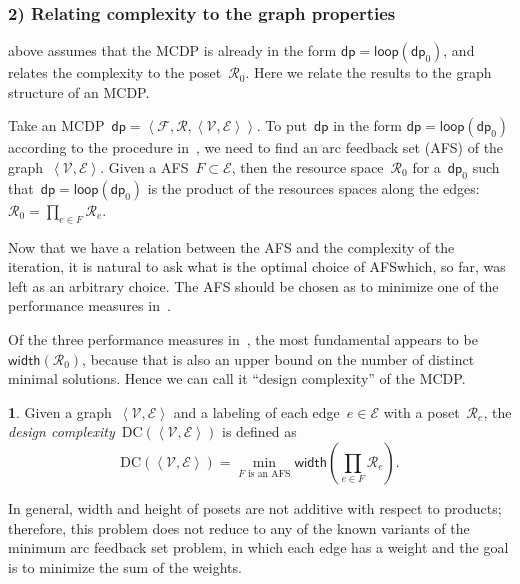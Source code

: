 \documentclass[twocolumn,english]{IEEEtran}
\theoremstyle{definition}
\newtheorem{defn}{\protect\definitionname}
\theoremstyle{plain}
\theoremstyle{definition}
\theoremstyle{remark}
\theoremstyle{definition}
\theoremstyle{plain}
\theoremstyle{plain}
\newcommand{\aword}[1]{\mathsf{#1}}
\newcommand{\vmath}[1]{\aword{#1}}
\newcommand{\posetwidth}{\vmath{width}}
\newcommand{\funsp}{\mathscr{F}}
\newcommand{\ressp}{\mathscr{R}}
\newcommand{\dprob}{\vmath{dp}}
\newcommand{\dploop}{\vmath{loop}}
\newcommand{\cdpiN}{\mathcal{V}}
\providecommand{\definitionname}{Definition}
\begin{document}
\subsubsection*{2) Relating complexity to the graph properties}

 above assumes that the MCDP is already in the
form $\dprob=\dploop(\dprob_{0})$, and relates the complexity to
the poset~$\ressp_{0}$. Here we relate the results to the graph
structure of an MCDP.

Take an MCDP~$\dprob=\left\langle \funsp,\ressp,\left\langle \cdpiN,\mathcal{E}\right\rangle \right\rangle $.
To put~$\dprob$ in the form $\dprob=\dploop(\dprob_{0})$ according
to the procedure in~, we need to find an arc
feedback set (AFS) of the graph~$\left\langle \cdpiN,\mathcal{E}\right\rangle $.
Given a AFS~$F\subset\mathcal{E}$, then the resource space~$\ressp_{0}$
for a~$\dprob_{0}$ such that~$\dprob=\dploop(\dprob_{0})$ is the
product of the resources spaces along the edges: $\ressp_{0}=\prod_{e\in F}\ressp_{e}.$

Now that we have a relation between the AFS and the complexity of
the iteration, it is natural to ask what is the optimal choice of
AFS\textemdash which, so far, was left as an arbitrary choice. The
AFS should be chosen as to minimize one of the performance measures
in~. 

Of the three performance measures in~, the most
fundamental appears to be~$\posetwidth(\ressp_{0})$, because that
is also an upper bound on the number of distinct minimal solutions.
Hence we can call it ``design complexity'' of the MCDP.
\begin{defn}
\label{def:design-complexity}Given a graph~$\left\langle \cdpiN,\mathcal{E}\right\rangle $
and a labeling of each edge~$e\in\mathcal{E}$ with a poset~$\ressp_{e}$,
the \emph{design complexity~}$\text{DC}(\left\langle \cdpiN,\mathcal{E}\right\rangle )$
is defined as 
\begin{equation}
\text{DC}(\left\langle \cdpiN,\mathcal{E}\right\rangle )=\min_{F\text{ is an AFS}}\posetwidth(\prod_{e\in F}\ressp_{e}).\label{eq:complexity}
\end{equation}
\end{defn}
In general, width and height of posets are not additive with respect
to products; therefore, this problem does not reduce to any of the
known variants of the minimum arc feedback set problem, in which
each edge has a weight and the goal is to minimize the sum of the
weights.
\end{document}

